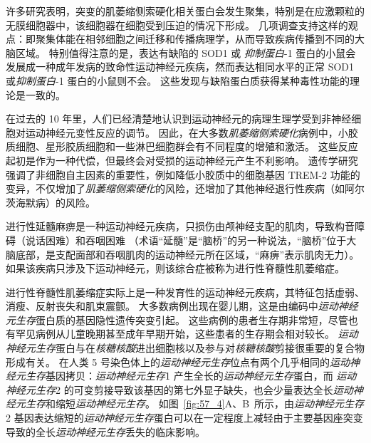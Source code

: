 许多研究表明，突变的肌萎缩侧索硬化相关蛋白会发生聚集，特别是在应激颗粒的无膜细胞器中，该细胞器在细胞受到压迫的情况下形成。
几项调查支持这样的观点：即聚集体能在相邻细胞之间迁移和传播病理学，从而导致疾病传播到不同的大脑区域。
特别值得注意的是，表达有缺陷的 SOD1 或 \textit{抑制蛋白}-1 蛋白的小鼠会发展成一种成年发病的致命性运动神经元疾病，然而表达相同水平的正常 SOD1 或\textit{抑制蛋白}-1 蛋白的小鼠则不会。
这些发现与缺陷蛋白质获得某种毒性功能的理论是一致的。


在过去的 10 年里，人们已经清楚地认识到运动神经元的病理生理学受到非神经细胞对运动神经元变性反应的调节。
因此，在大多数\textit{肌萎缩侧索硬化}病例中，小胶质细胞、星形胶质细胞和一些淋巴细胞群会有不同程度的增殖和激活。
这些反应起初是作为一种代偿，但最终会对受损的运动神经元产生不利影响。
遗传学研究强调了非细胞自主因素的重要性，例如降低小胶质中的细胞基因 TREM-2 功能的变异，不仅增加了\textit{肌萎缩侧索硬化}的风险，还增加了其他神经退行性疾病（如阿尔茨海默病）的风险。


进行性延髓麻痹是一种运动神经元疾病，只损伤由颅神经支配的肌肉，导致构音障碍（说话困难）和吞咽困难
（术语“延髓”是“脑桥”的另一种说法，“脑桥”位于大脑底部，是支配面部和吞咽肌肉的运动神经元所在区域，“麻痹”表示肌肉无力）。
如果该疾病只涉及下运动神经元，则该综合症被称为进行性脊髓性肌萎缩症。


进行性脊髓性肌萎缩症实际上是一种发育性的运动神经元疾病，其特征包括虚弱、消瘦、反射丧失和肌束震颤。
大多数病例出现在婴儿期，这是由编码中\textit{运动神经元生存}蛋白质的基因隐性遗传突变引起。
这些病例的患者生存期非常短，尽管也有罕见病例从儿童晚期甚至成年早期开始，这些患者的生存期会相对较长。
\textit{运动神经元生存}蛋白与在\textit{核糖核酸}进出细胞核以及参与对\textit{核糖核酸}剪接很重要的复合物形成有关。
在人类 5 号染色体上的\textit{运动神经元生存}位点有两个几乎相同的\textit{运动神经元生存}基因拷贝：\textit{运动神经元生存}1 产生全长的\textit{运动神经元生存}蛋白，而 \textit{运动神经元生存}2 的可变剪接导致该基因的第七外显子缺失，也会少量表达全长\textit{运动神经元生存}和缩短\textit{运动神经元生存}。
如图~\ref{fig:57_4}A、B~所示，由\textit{运动神经元生存}2 基因表达缩短的\textit{运动神经元生存}蛋白可以在一定程度上减轻由于主要基因座突变导致的全长\textit{运动神经元生存}丢失的临床影响。


